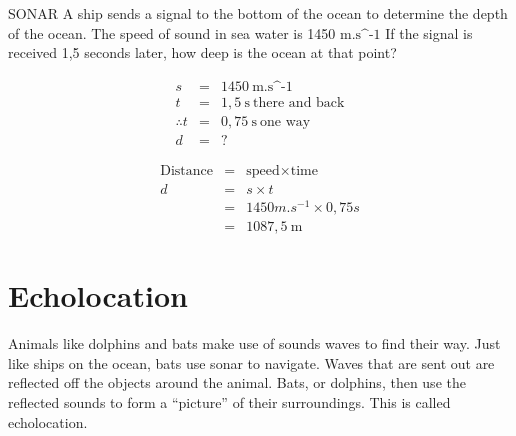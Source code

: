 \begin{wex}{SONAR}
{A ship sends a signal to the bottom of the ocean to determine the depth of the ocean. The speed of sound in sea water is 1450 $\text{m.s^{-1}}$ If the signal is received 1,5 seconds later, how deep is the ocean at that point?}
{
\begin{eqnarray*}
s &=& 1450 \ \text{m.s^{-1}}\\
t &=& 1,5 \ \text{s} \ \text{there \ and \ back}\\
\therefore t &= & 0,75 \ \text{s} \ \text{one \ way}\\
d &=& ?
\end{eqnarray*}

\begin{eqnarray*}
\text{Distance} &=& \text{speed} \times \text{time} \\
d &=& s \times t \\
&=& 1450 m.s^{-1} \times 0,75 s \\
&=& 1087,5 \ \text{m}
\end{eqnarray*}

}
\end{wex}
    \noindent
    \label{m38800*eip-656}
          
\section*{Echolocation}
            \nopagebreak
        \label{m38800*id185251}Animals like dolphins and bats make use of sounds waves to find their way. Just like ships on the ocean, bats use sonar to navigate. Waves that are sent out are reflected off the objects around the animal. Bats, or dolphins, then use the reflected sounds to form a ``picture'' of their surroundings. This is called echolocation.\par 


